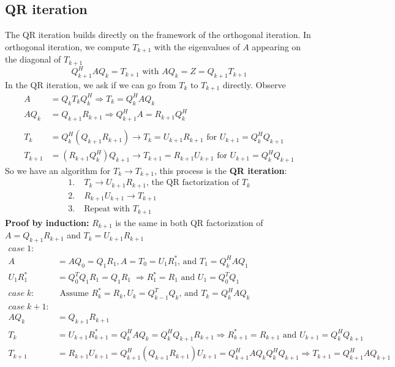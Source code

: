 \documentclass{article}
\begin{document}
\subsection{QR iteration}
The QR iteration builds directly on the framework of the orthogonal iteration. In orthogonal iteration, we compute $T_{k+1}$ with the eigenvalues of $A$ appearing on the diagonal of $T_{k+1}$
\begin{equation*}
    Q_{k+1}^HAQ_k = T_{k+1} \textrm{ with }AQ_k = Z = Q_{k+1}T_{k+1}
\end{equation*} 
In the QR iteration, we ask if we can go from $T_k$ to $T_{k+1}$ directly. Observe
\begin{align*}
    A &= Q_k T_k Q_k^H \Longrightarrow T_k = Q_k^HAQ_k\\
    AQ_k &= Q_{k+1}R_{k+1} \Longrightarrow Q_{k+1}^HA = R_{k+1}Q_k^H\\ \\
    T_k &= Q_k^H(Q_{k+1}R_{k+1}) \longrightarrow T_k = U_{k+1} R_{k+1} \textrm{ for } U_{k+1} = Q_k^HQ_{k+1}\\
    T_{k+1} &= (R_{k+1}Q_k^H)Q_{k+1} \longrightarrow T_{k+1} = R_{k+1}U_{k+1} \textrm{ for } U_{k+1} = Q_k^HQ_{k+1}
\end{align*} 
So we have an algorithm for $T_k \rightarrow T_{k+1}$, this process is the \textbf{QR iteration}:
\begin{align*}
    1. \;& T_k \longrightarrow U_{k+1}R_{k+1} \textrm{, the QR factorization of } T_k\\
    2. \;&R_{k+1}U_{k+1} \longrightarrow T_{k+1}\\
    3. \;&\textrm{Repeat with } T_{k+1}
\end{align*}
\textbf{Proof by induction:} $R_{k+1}$ is the same in both QR factorization of $A = Q_{k+1}R_{k+1}$ and $T_k = U_{k+1}R_{k+1}$
\begin{align*}
    case \; 1:&\\
    A &= AQ_0 = Q_1R_1, A = T_0 =U_1R_1^* \textrm{, and } T_1 = Q_k^HAQ_1\\
    U_1R_1^* &= Q_0^TQ_1R_1 = Q_1R_1 \; \Longrightarrow R_1^* = R_1 \textrm{ and } U_1 = Q_0^TQ_1\\
    case \; k:& \textrm{ Assume } R_k^* = R_k, U_k = Q_{k-1}^TQ_k \textrm{, and } T_k = Q_k^HAQ_k\\
    case \; k+1:&\\
    AQ_k &= Q_{k+1}R_{k+1}\\
    T_k &=U_{k+1}R_{k+1}^* = Q_k^HAQ_k = Q_k^HQ_{k+1}R_{k+1} \Longrightarrow R_{k+1}^* = R_{k+1} \text{ and } U_{k+1} = Q_k^HQ_{k+1}\\
    T_{k+1} &= R_{k+1}U_{k+1} = Q_{k+1}^H(Q_{k+1}R_{k+1})U_{k+1} = Q_{k+1}^HAQ_kQ_k^HQ_{k+1} \Longrightarrow T_{k+1} = Q_{k+1}^HAQ_{k+1}
\end{align*}
\end{document}

